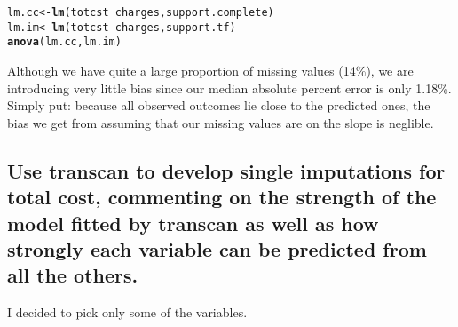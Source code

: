 \documentclass[headinclude=false]{scrartcl}\usepackage[]{graphicx}\usepackage[]{color}
\makeatletter
\newcommand{\hlopt}[1]{\textcolor[rgb]{0,0,0}{#1}}%
\newcommand{\hlstd}[1]{\textcolor[rgb]{0.345,0.345,0.345}{#1}}%
\newcommand{\hlkwb}[1]{\textcolor[rgb]{0.69,0.353,0.396}{#1}}%
\newcommand{\hlkwd}[1]{\textcolor[rgb]{0.737,0.353,0.396}{\textbf{#1}}}%
\newenvironment{kframe}{%
 \def\at@end@of@kframe{}%
 \ifinner\ifhmode%
  \def\at@end@of@kframe{\end{minipage}}%
  \begin{minipage}{\columnwidth}%
 \fi\fi%
 \def\FrameCommand##1{\hskip\@totalleftmargin \hskip-\fboxsep
 \colorbox{shadecolor}{##1}\hskip-\fboxsep
     \hskip-\linewidth \hskip-\@totalleftmargin \hskip\columnwidth}%
 \MakeFramed {\advance\hsize-\width
   \@totalleftmargin\z@ \linewidth\hsize
   \@setminipage}}%
 {\par\unskip\endMakeFramed%
 \at@end@of@kframe}
\newenvironment{knitrout}{}{} %
\makeatother
\begin{document}
\begin{knitrout}
\color{fgcolor}\begin{kframe}
\begin{alltt}
\hlstd{lm.cc} \hlkwb{<-} \hlkwd{lm}\hlstd{(totcst} \hlopt{~} \hlstd{charges, support.complete)}
\hlstd{lm.im} \hlkwb{<-} \hlkwd{lm}\hlstd{(totcst} \hlopt{~} \hlstd{charges, support.tf)}
\hlkwd{anova}\hlstd{(lm.cc, lm.im)}
\end{alltt}


{\ttfamily\noindent\bfseries\color{errorcolor}{\#\# Error in anova.lmlist(object, ...): models were not all fitted to the same size of dataset}}\end{kframe}
\end{knitrout}

Although we have quite a large proportion of missing values (14\%), we are
introducing very little bias since our median absolute percent error is only 
1.18\%. Simply put: because all observed outcomes lie close to the
predicted ones, the bias we get from assuming that our missing values are on
the slope is neglible.

\subsection{Use transcan to develop single imputations for total cost, commenting on
the strength of the model fitted by transcan as well as how strongly each
variable can be predicted from all the others.}

I decided to pick only some of the variables.
\end{document}
